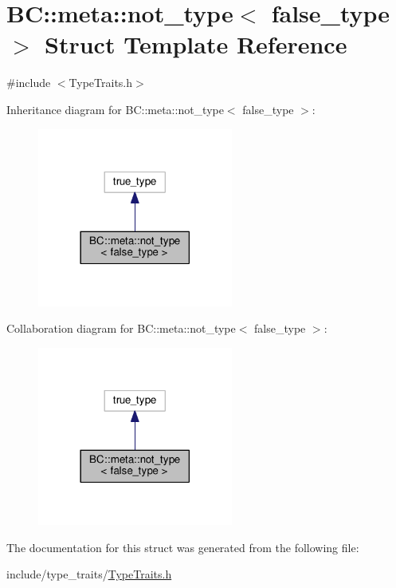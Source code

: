 \hypertarget{structBC_1_1meta_1_1not__type_3_01false__type_01_4}{}\section{BC\+:\+:meta\+:\+:not\+\_\+type$<$ false\+\_\+type $>$ Struct Template Reference}
\label{structBC_1_1meta_1_1not__type_3_01false__type_01_4}


{\ttfamily \#include $<$Type\+Traits.\+h$>$}



Inheritance diagram for BC\+:\+:meta\+:\+:not\+\_\+type$<$ false\+\_\+type $>$\+:
\nopagebreak
\begin{figure}[H]
\begin{center}
\leavevmode
\includegraphics[width=182pt]{structBC_1_1meta_1_1not__type_3_01false__type_01_4__inherit__graph}
\end{center}
\end{figure}


Collaboration diagram for BC\+:\+:meta\+:\+:not\+\_\+type$<$ false\+\_\+type $>$\+:
\nopagebreak
\begin{figure}[H]
\begin{center}
\leavevmode
\includegraphics[width=182pt]{structBC_1_1meta_1_1not__type_3_01false__type_01_4__coll__graph}
\end{center}
\end{figure}


The documentation for this struct was generated from the following file\+:\begin{DoxyCompactItemize}
\item 
include/type\+\_\+traits/\hyperlink{TypeTraits_8h}{Type\+Traits.\+h}\end{DoxyCompactItemize}
